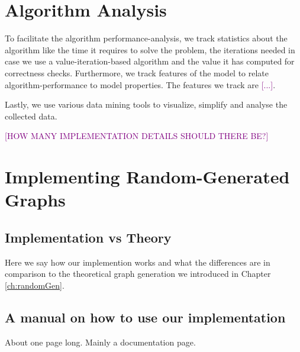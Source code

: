 
\chapter{Algorithm Analysis}

To facilitate the algorithm performance-analysis, we track statistics about the algorithm like the time it requires to solve the problem, the iterations needed in case we use a value-iteration-based algorithm and the value it has computed for correctness checks. Furthermore, we track features of the model to relate algorithm-performance to model properties. The features we track are \textcolor{purple}{[...]}.

Lastly, we use various data mining tools to visualize, simplify and analyse the collected data.

\textcolor{purple}{[HOW MANY IMPLEMENTATION DETAILS SHOULD THERE BE?]}

\chapter{Implementing Random-Generated Graphs}
\section{Implementation vs Theory}
Here we say how our implemention works and what the differences are in comparison to the theoretical graph generation we introduced in Chapter \ref{ch:randomGen}.

\section{A manual on how to use our implementation}
About one page long. Mainly a documentation page.


